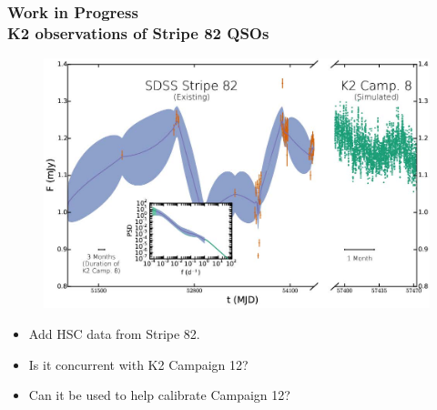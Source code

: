 \documentclass[hyperref={pdfpagelabels=false}]{beamer}
\begin{document}
\begin{frame}
\frametitle{Work in Progress\\K2 observations of Stripe 82 QSOs}
        \begin{figure}
          \includegraphics[scale=0.20]{images/LC_2.jpg}
        \end{figure}
        \begin{itemize}
          \item Add HSC data from Stripe 82.
          \item Is it concurrent with K2 Campaign 12?
          \item Can it be used to help calibrate Campaign 12?
        \end{itemize}
\end{frame}
\end{document}

